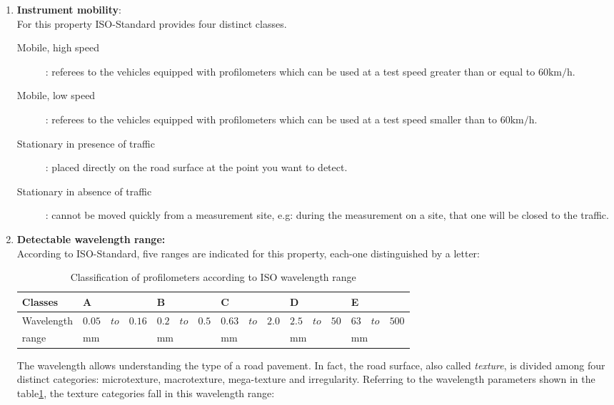 \documentclass[tesi]{subfiles}
\begin{document}
\begin{enumerate}

\item \textbf{Instrument mobility}:\\ For this property ISO-Standard\cite{iso_standard} provides four distinct classes.
\begin{description}
\item [Mobile, high speed]: referees to the vehicles equipped with profilometers which can be used at a test speed greater than or equal to $\num{60} \si{\km\per\hour}$.
\item [Mobile, low speed]: referees to the vehicles equipped with profilometers which can be used at a test speed smaller than to $\num{60} \si{\km\per\hour}$.
\item [Stationary in presence of traffic]: placed directly on the road surface at the point you want to detect.
\item [Stationary in absence of traffic]: cannot be moved quickly from a measurement site, e.g: during the measurement on a site, that one will be closed to the traffic.
\end{description}
\item \textbf{Detectable wavelength range:}\\ According to ISO-Standard\cite{iso_standard}, five ranges are indicated for this property, each-one distinguished by a letter:


\begin{table}[ht]
\centering
    \begin{tabular}{ | l | l | l | l | l | l |}

    \hline
    Classes &\quad A &\quad B &\quad C &\quad D &\quad E \\ \hline
    Wavelength &	$ 0.05 \quad to \quad 0.16$&	$ 0.2 \quad to \quad 0.5$&		$0.63 \quad to \quad 2.0$&	$2.5 \quad to \quad 50$&	$63 \quad to \quad 500$\\
    \quad range &\quad $\si{\milli\meter}$ &\quad  $\si{\milli\meter}$ &\quad  $\si{\milli\meter}$ &\quad  $\si{\milli\meter}$ &\quad  $\si{\milli\meter}$ \\
\hline
    \end{tabular}
 \caption{Classification of profilometers according to ISO wavelength range}
 \label{table:iso_wave}
\end{table}

\noindent The wavelength allows understanding the type of a road pavement. In fact, the road surface, also called \textit{texture}, is divided among four distinct categories: microtexture, macrotexture, mega-texture and irregularity. Referring to the wavelength parameters shown in the table\ref{table:iso_wave}, the texture categories fall in this wavelength range\cite{sayers1996interpretation}:\\


\end{enumerate}
\end{document}
